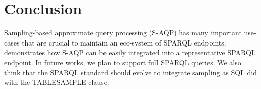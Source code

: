 
\section{Conclusion}

Sampling-based approximate query processing (S-AQP) has many important
use-cases that are crucial to maintain an eco-system of SPARQL
endpoints. \NAME demonstrates how S-AQP can be easily integrated into
a representative SPARQL endpoint. In future works, we plan to support
full SPARQL queries. We also think that the SPARQL standard should
evolve to integrate sampling as SQL did with the TABLESAMPLE clause.
